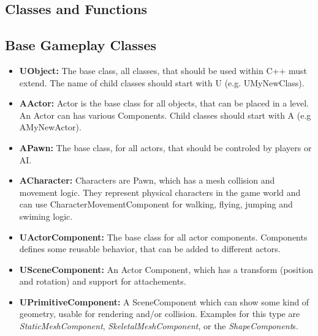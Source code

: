 \documentclass[10pt,a4paper]{article}
\begin{document}
\begin{multicols*}{2}
	\section{Classes and Functions}

	\subsection{Base Gameplay Classes}
	
	\begin{itemize}
		\item \textbf{UObject:} The base class, all classes, that should be used within C++ must extend. The name of child classes should start with U (e.g. UMyNewClass).
		\item \textbf{AActor:} Actor is the base class for all objects, that can be placed in a level. An Actor can has various Components. Child classes should start with A (e.g AMyNewActor).
		\item \textbf{APawn:} The base class, for all actors, that should be controled by players or AI.
		\item \textbf{ACharacter:} Characters are Pawn, which has a mesh collision and movement logic. They represent physical characters in the game world and can use CharacterMovementComponent for walking, flying, jumping and swiming logic.
		\item \textbf{UActorComponent:} The base class for all actor components. Components defines some reusable behavior, that can be added to different actors.
		\item \textbf{USceneComponent:} An Actor Component, which has a transform (position and rotation) and support for attachements.
		\item \textbf{UPrimitiveComponent:} A SceneComponent which can show some kind of geometry, usable for rendering and/or collision. Examples for this type are \emph{StaticMeshComponent}, \emph{SkeletalMeshComponent}, or the \emph{ShapeComponent}s.
		
	\end{itemize}
	

\end{multicols*}
\end{document}
